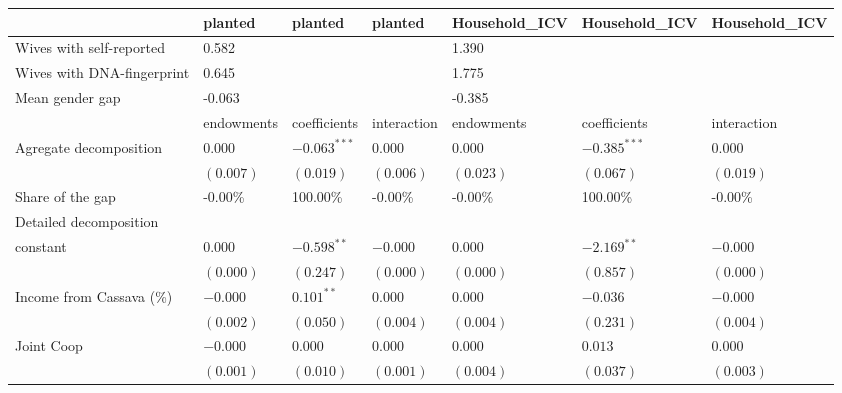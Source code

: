 \begin{tabular}{lllllll}
\toprule
{} &     planted &          planted &      planted & Household_ICV &    Household_ICV & Household_ICV \\
\midrule
Wives with self-reported                &       0.582 &                  &              &         1.390 &                  &               \\
Wives with DNA-fingerprint              &       0.645 &                  &              &         1.775 &                  &               \\
Mean gender gap                         &      -0.063 &                  &              &        -0.385 &                  &               \\
                                        &  endowments &     coefficients &  interaction &    endowments &     coefficients &   interaction \\
Agregate decomposition                  &     $0.000$ &  $-0.063 ^{***}$ &      $0.000$ &       $0.000$ &  $-0.385 ^{***}$ &       $0.000$ \\
                                        &   $(0.007)$ &        $(0.019)$ &    $(0.006)$ &     $(0.023)$ &        $(0.067)$ &     $(0.019)$ \\
Share of the gap                        &     -0.00\% &         100.00\% &      -0.00\% &       -0.00\% &         100.00\% &       -0.00\% \\
Detailed decomposition                  &             &                  &              &               &                  &               \\
constant                                &     $0.000$ &   $-0.598 ^{**}$ &     $-0.000$ &       $0.000$ &   $-2.169 ^{**}$ &      $-0.000$ \\
                                        &   $(0.000)$ &        $(0.247)$ &    $(0.000)$ &     $(0.000)$ &        $(0.857)$ &     $(0.000)$ \\
Income from Cassava (\%)                 &    $-0.000$ &    $0.101 ^{**}$ &      $0.000$ &       $0.000$ &         $-0.036$ &      $-0.000$ \\
                                        &   $(0.002)$ &        $(0.050)$ &    $(0.004)$ &     $(0.004)$ &        $(0.231)$ &     $(0.004)$ \\
Joint Coop                              &    $-0.000$ &          $0.000$ &      $0.000$ &       $0.000$ &          $0.013$ &       $0.000$ \\
                                        &   $(0.001)$ &        $(0.010)$ &    $(0.001)$ &     $(0.004)$ &        $(0.037)$ &     $(0.003)$ \\

\end{tabular}
